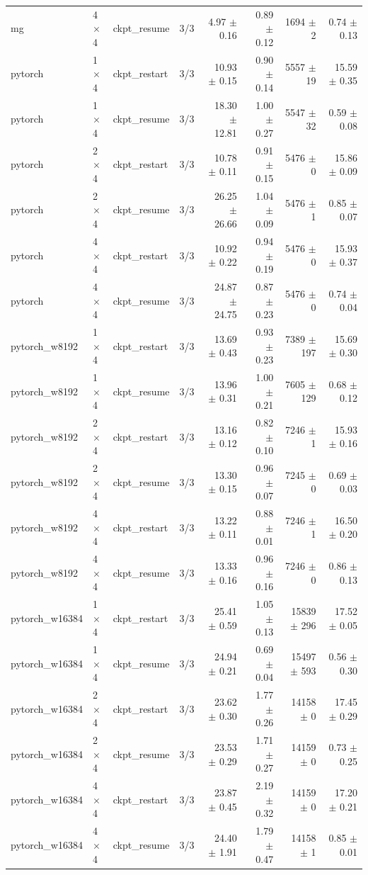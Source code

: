 \begin{tabular}{lllrrrrr}
mg & 4$\times$4 & ckpt\_resume & 3/3 & 4.97 $\pm$ 0.16 & 0.89 $\pm$ 0.12 & 1694 $\pm$ 2 & 0.74 $\pm$ 0.13 \\
pytorch & 1$\times$4 & ckpt\_restart & 3/3 & 10.93 $\pm$ 0.15 & 0.90 $\pm$ 0.14 & 5557 $\pm$ 19 & 15.59 $\pm$ 0.35 \\
pytorch & 1$\times$4 & ckpt\_resume & 3/3 & 18.30 $\pm$ 12.81 & 1.00 $\pm$ 0.27 & 5547 $\pm$ 32 & 0.59 $\pm$ 0.08 \\
pytorch & 2$\times$4 & ckpt\_restart & 3/3 & 10.78 $\pm$ 0.11 & 0.91 $\pm$ 0.15 & 5476 $\pm$ 0 & 15.86 $\pm$ 0.09 \\
pytorch & 2$\times$4 & ckpt\_resume & 3/3 & 26.25 $\pm$ 26.66 & 1.04 $\pm$ 0.09 & 5476 $\pm$ 1 & 0.85 $\pm$ 0.07 \\
pytorch & 4$\times$4 & ckpt\_restart & 3/3 & 10.92 $\pm$ 0.22 & 0.94 $\pm$ 0.19 & 5476 $\pm$ 0 & 15.93 $\pm$ 0.37 \\
pytorch & 4$\times$4 & ckpt\_resume & 3/3 & 24.87 $\pm$ 24.75 & 0.87 $\pm$ 0.23 & 5476 $\pm$ 0 & 0.74 $\pm$ 0.04 \\
pytorch\_w8192 & 1$\times$4 & ckpt\_restart & 3/3 & 13.69 $\pm$ 0.43 & 0.93 $\pm$ 0.23 & 7389 $\pm$ 197 & 15.69 $\pm$ 0.30 \\
pytorch\_w8192 & 1$\times$4 & ckpt\_resume & 3/3 & 13.96 $\pm$ 0.31 & 1.00 $\pm$ 0.21 & 7605 $\pm$ 129 & 0.68 $\pm$ 0.12 \\
pytorch\_w8192 & 2$\times$4 & ckpt\_restart & 3/3 & 13.16 $\pm$ 0.12 & 0.82 $\pm$ 0.10 & 7246 $\pm$ 1 & 15.93 $\pm$ 0.16 \\
pytorch\_w8192 & 2$\times$4 & ckpt\_resume & 3/3 & 13.30 $\pm$ 0.15 & 0.96 $\pm$ 0.07 & 7245 $\pm$ 0 & 0.69 $\pm$ 0.03 \\
pytorch\_w8192 & 4$\times$4 & ckpt\_restart & 3/3 & 13.22 $\pm$ 0.11 & 0.88 $\pm$ 0.01 & 7246 $\pm$ 1 & 16.50 $\pm$ 0.20 \\
pytorch\_w8192 & 4$\times$4 & ckpt\_resume & 3/3 & 13.33 $\pm$ 0.16 & 0.96 $\pm$ 0.16 & 7246 $\pm$ 0 & 0.86 $\pm$ 0.13 \\
pytorch\_w16384 & 1$\times$4 & ckpt\_restart & 3/3 & 25.41 $\pm$ 0.59 & 1.05 $\pm$ 0.13 & 15839 $\pm$ 296 & 17.52 $\pm$ 0.05 \\
pytorch\_w16384 & 1$\times$4 & ckpt\_resume & 3/3 & 24.94 $\pm$ 0.21 & 0.69 $\pm$ 0.04 & 15497 $\pm$ 593 & 0.56 $\pm$ 0.30 \\
pytorch\_w16384 & 2$\times$4 & ckpt\_restart & 3/3 & 23.62 $\pm$ 0.30 & 1.77 $\pm$ 0.26 & 14158 $\pm$ 0 & 17.45 $\pm$ 0.29 \\
pytorch\_w16384 & 2$\times$4 & ckpt\_resume & 3/3 & 23.53 $\pm$ 0.29 & 1.71 $\pm$ 0.27 & 14159 $\pm$ 0 & 0.73 $\pm$ 0.25 \\
pytorch\_w16384 & 4$\times$4 & ckpt\_restart & 3/3 & 23.87 $\pm$ 0.45 & 2.19 $\pm$ 0.32 & 14159 $\pm$ 0 & 17.20 $\pm$ 0.21 \\
pytorch\_w16384 & 4$\times$4 & ckpt\_resume & 3/3 & 24.40 $\pm$ 1.91 & 1.79 $\pm$ 0.47 & 14158 $\pm$ 1 & 0.85 $\pm$ 0.01 \\
\bottomrule
\end{tabular}
